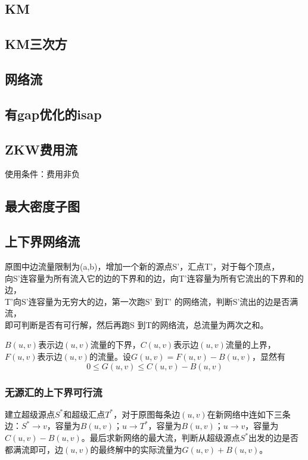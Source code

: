 \documentclass[landscape,a4paper]{article}
\begin{document}
\begin{spacing}{0.3}
\begin{multicols}{2}
		\subsection{KM}
		
		\subsection{KM三次方}
		
		\subsection{网络流}
		
		\subsection{有gap优化的isap}
		
		\subsection{ZKW费用流}
		使用条件：费用非负
		
		\subsection{最大密度子图}
		
			\subsection{上下界网络流}
原图中边流量限制为(a,b)，增加一个新的源点S’，汇点T’，对于每个顶点，\\
向S’连容量为所有流入它的边的下界和的边，向T’连容量为所有它流出的下界和的边，\\
T’向S’连容量为无穷大的边，第一次跑S’ 到T’ 的网络流，判断S’流出的边是否满流，\\
即可判断是否有可行解，然后再跑S 到T的网络流，总流量为两次之和。

$B(u,v)$表示边$(u,v)$流量的下界，$C(u,v)$表示边$(u,v)$流量的上界，$F(u,v)$表示边$(u,v)$的流量。设$G(u,v) = F(u,v) - B(u,v)$，显然有
	$$0 \leq G(u,v) \leq C(u,v)-B(u,v)$$

\subsubsection{无源汇的上下界可行流}

建立超级源点$S^*$和超级汇点$T^*$，对于原图每条边$(u,v)$在新网络中连如下三条边：$S^* \rightarrow v$，容量为$B(u,v)$；$u \rightarrow T^*$，容量为$B(u,v)$；$u \rightarrow v$，容量为$C(u,v) - B(u,v)$。最后求新网络的最大流，判断从超级源点$S^*$出发的边是否都满流即可，边$(u,v)$的最终解中的实际流量为$G(u,v)+B(u,v)$。


\end{multicols}
\end{spacing}
\end{document}
